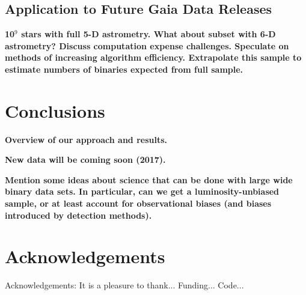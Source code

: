 \documentclass[usenatbib]{mnras}
\begin{document}
\subsection{Application to Future Gaia Data Releases}
{\bf 10$^9$ stars with full 5-D astrometry. What about subset with 6-D astrometry? Discuss computation expense challenges. Speculate on methods of increasing algorithm efficiency. Extrapolate this sample to estimate numbers of binaries expected from full sample. } 





\section{Conclusions}

{\bf Overview of our approach and results.}

{\bf New data will be coming soon (2017).}

{\bf Mention some ideas about science that can be done with large wide binary data sets. In particular, can we get a luminosity-unbiased sample, or at least account for observational biases (and biases introduced by detection methods).}


\section*{Acknowledgements}
Acknowledgements:
It is a pleasure to thank...
Funding...
Code...





\label{lastpage}
\end{document}
